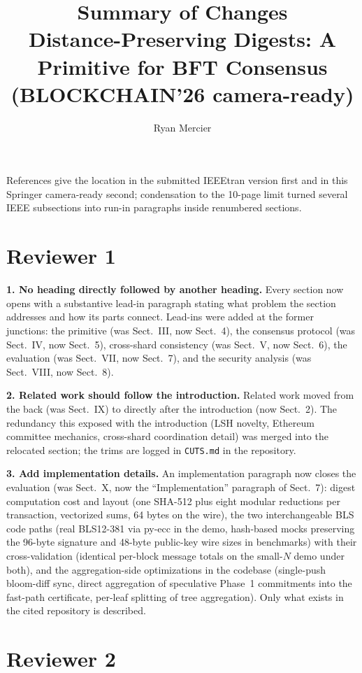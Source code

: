 \documentclass[10pt]{article}
\title{\vspace{-1.2cm}Summary of Changes\\[2pt]
\large Distance-Preserving Digests: A Primitive for BFT Consensus (BLOCKCHAIN'26 camera-ready)}
\author{Ryan Mercier}
\date{}
\begin{document}
\maketitle
\vspace{-1.1cm}

References give the location in the submitted IEEEtran version first and in
this Springer camera-ready second; condensation to the 10-page limit turned
several IEEE subsections into run-in paragraphs inside renumbered sections.

\section*{Reviewer 1}

\textbf{1. No heading directly followed by another heading.} Every section
now opens with a substantive lead-in paragraph stating what problem the
section addresses and how its parts connect. Lead-ins were added at the
former junctions: the primitive (was Sect.~III, now Sect.~4), the consensus
protocol (was Sect.~IV, now Sect.~5), cross-shard consistency (was
Sect.~V, now Sect.~6), the evaluation (was Sect.~VII, now Sect.~7), and the
security analysis (was Sect.~VIII, now Sect.~8).

\textbf{2. Related work should follow the introduction.} Related work moved
from the back (was Sect.~IX) to directly after the introduction (now
Sect.~2). The redundancy this exposed with the introduction (LSH novelty,
Ethereum committee mechanics, cross-shard coordination detail) was merged
into the relocated section; the trims are logged in \texttt{CUTS.md} in the
repository.

\textbf{3. Add implementation details.} An implementation paragraph now
closes the evaluation (was Sect.~X, now the ``Implementation'' paragraph of
Sect.~7): digest computation cost and layout (one SHA-512 plus eight
modular reductions per transaction, vectorized sums, 64 bytes on the wire),
the two interchangeable BLS code paths (real BLS12-381 via py-ecc in the
demo, hash-based mocks preserving the 96-byte signature and 48-byte
public-key wire sizes in benchmarks) with their cross-validation
(identical per-block message totals on the small-$N$ demo under both), and
the aggregation-side optimizations in the codebase (single-push bloom-diff
sync, direct aggregation of speculative Phase~1 commitments into the
fast-path certificate, per-leaf splitting of tree aggregation). Only what
exists in the cited repository is described.

\section*{Reviewer 2}
\end{document}
